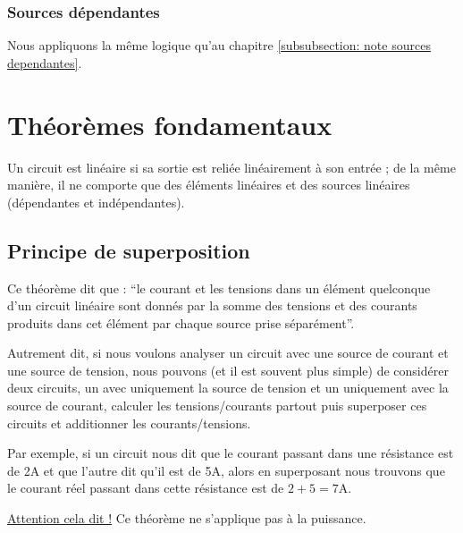\documentclass[12pt,a4paper]{article}
\begin{document}
\subsubsection[Note sur les sources dépendantes]{Sources dépendantes}
Nous appliquons la même logique qu'au chapitre \ref{subsubsection: note sources dependantes}.
\section{Théorèmes fondamentaux}
\label{section: theo fondamentaux}
 Un circuit est linéaire si sa sortie est reliée linéairement à son entrée ; de la même manière, il ne comporte que des éléments linéaires et des sources linéaires (dépendantes et indépendantes). 

\subsection{Principe de superposition}
Ce théorème dit que : ``le courant et les tensions dans un élément quelconque d'un circuit linéaire sont donnés par la somme des tensions et des courants produits dans cet élément par chaque source prise séparément''. 

Autrement dit, si nous voulons analyser un circuit avec une source de courant et une source de tension, nous pouvons (et il est souvent plus simple) de considérer deux circuits, un avec uniquement la source de tension et un uniquement avec la source de courant, calculer les tensions/courants partout puis superposer ces circuits et additionner les courants/tensions. 

Par exemple, si un circuit nous dit que le courant passant dans une résistance est de 2A et que l'autre dit qu'il est de 5A, alors en superposant nous trouvons que le courant réel passant dans cette résistance est de $2+5 = 7$A.

\uline{Attention cela dit !} Ce théorème ne s'applique pas à la puissance.
\end{document}
